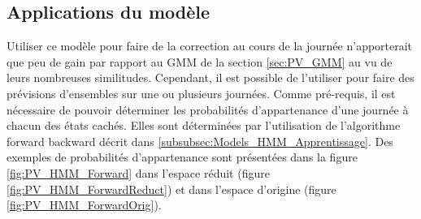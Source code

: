 \documentclass[12pt, french]{report}
\begin{document}

\subsection{Applications du modèle}

Utiliser ce modèle pour faire de la correction au cours de la journée n'apporterait que peu de gain par rapport au GMM de la section \ref{sec:PV_GMM} au vu de leurs nombreuses similitudes. Cependant, il est possible de l'utiliser pour faire des prévisions d'ensembles sur une ou plusieurs journées. Comme pré-requis, il est nécessaire de pouvoir déterminer les probabilités d'appartenance d'une journée à chacun des états cachés. Elles sont déterminées par l'utilisation de l'algorithme forward backward décrit dans \ref{subsubsec:Models_HMM_Apprentissage}. Des exemples de probabilités d'appartenance sont présentées dans la figure \ref{fig:PV_HMM_Forward} dans l'espace réduit (figure \ref{fig:PV_HMM_ForwardReduct}) et dans l'espace d'origine (figure \ref{fig:PV_HMM_ForwardOrig}).
\end{document}
